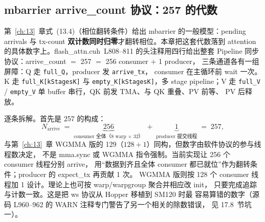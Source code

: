 \subsection{mbarrier arrive\_count 协议：257 的代数}

第~\ref{ch:13}~章式~(13.4)（相位翻转条件）给出 mbarrier 的一般模型：pending
arrivals 与 tx-count \textbf{双计数同时归零}才翻转相位。本章把这套代数落到
attention 的具体数字上。flash\_attn.cuh~L808--811 的头注释用四行给出整套
Pipeline 同步协议：arrive\_count $=$ 257 $=$ 256 consumer $+$ 1 producer，
三条通道各有一组屏障：Q 走 \texttt{full\_Q}，producer 发 \texttt{arrive\_tx}，
consumer 在主循环前 wait 一次。K 走 \texttt{full\_K[kStagesK]} 与
\texttt{empty\_K[kStagesK]}，多 stage pipeline；V 走 \texttt{full\_V} /
\texttt{empty\_V} 单 buffer 串行，QK 前发 TMA、与 QK 重叠、PV 前等、
PV 后释放。

逐条拆解。首先是 257 的构成：
\begin{equation}
  N_{\text{arrive}} \;=\;
  \underbrace{256}_{\text{consumer 全体（8 warp $\times$ 32）}}
  \;+\; \underbrace{1}_{\text{producer 提交线程}} \;=\; 257 ,
  \label{eq:17-257}
\end{equation}
与第~\ref{ch:13}~章 WGMMA 版的 129（$128 + 1$）同构，但数字由软件协议的参与线程数决定，
不是 mma.sync 或 WGMMA 指令强制。当前实现让 256 个 consumer 线程分别 arrive，
用“数据到齐且全体 consumer 都已就位”作为翻转条件；producer 的 expect\_tx 再贡献 1 次。
WGMMA 版则按 128 个 consumer 线程加 1 设计。理论上也可按 warp/warpgroup 聚合并相应改 init，
只要完成追踪与计数一致。这是把 ws 协议从 Hopper 移植到 SM120 时最
容易算错的数字（源码 L960--962 的 WARN 注释专门警告了另一个相关的除数错误，
见 17.8~节坑一）。

